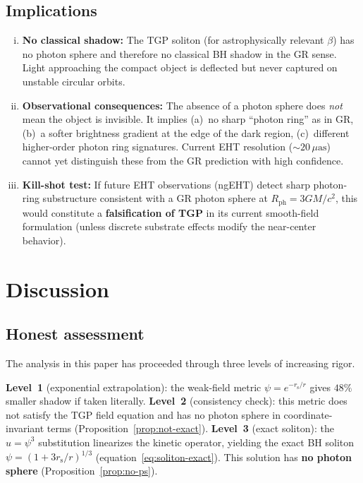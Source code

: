 \documentclass[11pt,a4paper]{article}
\theoremstyle{definition}
\theoremstyle{remark}
\newcommand{\rs}{r_{\mathrm{s}}}
\begin{document}
\subsection{Implications}\label{ssec:implications}

\begin{enumerate}[(i)]
\item \textbf{No classical shadow:}\quad
  The TGP soliton (for astrophysically relevant $\beta$) has no photon
  sphere and therefore no classical BH shadow in the GR sense.
  Light approaching the compact object is deflected but never captured
  on unstable circular orbits.

\item \textbf{Observational consequences:}\quad
  The absence of a photon sphere does \emph{not} mean the object is
  invisible.  It implies (a)~no sharp ``photon ring'' as in GR,
  (b)~a softer brightness gradient at the edge of the dark region,
  (c)~different higher-order photon ring signatures.  Current EHT
  resolution ($\sim 20\,\mu\mathrm{as}$) cannot yet distinguish these
  from the GR prediction with high confidence.

\item \textbf{Kill-shot test:}\quad
  If future EHT observations (ngEHT) detect sharp photon-ring
  substructure consistent with a GR photon sphere at
  $R_{\mathrm{ph}} = 3GM/c^2$, this would constitute a
  \textbf{falsification of TGP} in its current smooth-field
  formulation (unless discrete substrate effects modify the
  near-center behavior).
\end{enumerate}

\section{Discussion}\label{sec:discussion}

\subsection{Honest assessment}

The analysis in this paper has proceeded through three levels of
increasing rigor.

\textbf{Level~1} (exponential extrapolation): the weak-field metric
$\psi = e^{-\rs/r}$ gives $48\%$ smaller shadow if taken literally.
\textbf{Level~2} (consistency check): this metric does not satisfy the
TGP field equation and has no photon sphere in coordinate-invariant
terms (Proposition~\ref{prop:not-exact}).
\textbf{Level~3} (exact soliton): the $u = \psi^3$ substitution
linearizes the kinetic operator, yielding the exact BH soliton
$\psi = (1 + 3\rs/r)^{1/3}$ (equation~\eqref{eq:soliton-exact}).
This solution has \textbf{no photon sphere}
(Proposition~\ref{prop:no-ps}).
\end{document}
